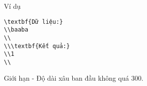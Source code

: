 Ví dụ  
\begin{verbatim}
\textbf{Dữ liệu:}
\\baaba
\\
\\\textbf{Kết quả:}
\\1
\\\end{verbatim}
   Giới hạn  
- Độ dài xâu ban đầu không quá 300.